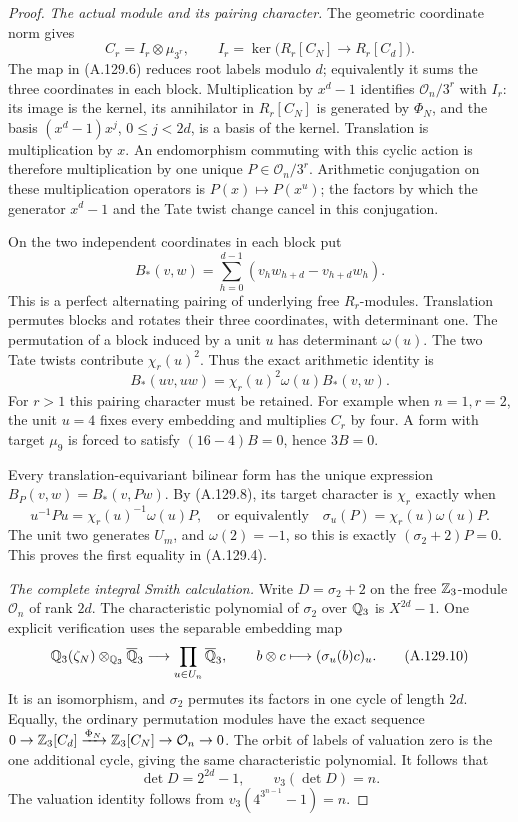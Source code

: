 \begin{proof}
\emph{The actual module and its pairing character.}
The geometric coordinate norm gives
\[
 C_r=I_r\otimes\mu_{3^r},\qquad
 I_r=\ker\bigl(R_r[C_N]\longrightarrow R_r[C_d]\bigr).
 \tag{A.129.6}
\]
The map in (A.129.6) reduces root labels modulo \(d\);
equivalently it sums the three coordinates in each block.
Multiplication by \(x^d-1\) identifies
\(\mathcal O_n/3^r\) with \(I_r\): its image is the kernel,
its annihilator in \(R_r[C_N]\) is generated by \(\Phi_N\),
and the basis \((x^d-1)x^j\), \(0\le j<2d\), is a basis
of the kernel.  Translation is multiplication by \(x\).
An endomorphism commuting with this cyclic action is therefore
multiplication by one unique \(P\in\mathcal O_n/3^r\).
Arithmetic conjugation on these multiplication operators is
\(P(x)\mapsto P(x^u)\); the factors by which the generator
\(x^d-1\) and the Tate twist change cancel in this conjugation.

On the two independent coordinates in each block put
\[
       B_*(v,w)=\sum_{h=0}^{d-1}
                         (v_hw_{h+d}-v_{h+d}w_h).
 \tag{A.129.7}
\]
This is a perfect alternating pairing of underlying free
\(R_r\)-modules.  Translation permutes blocks and rotates
their three coordinates, with determinant one.
The permutation of a block induced by a unit \(u\) has
determinant \(\omega(u)\).  The two Tate twists contribute
\(\chi_r(u)^2\).  Thus the exact arithmetic identity is
\[
                B_*(uv,uw)=\chi_r(u)^2\omega(u)B_*(v,w).
 \tag{A.129.8}
\]
For \(r>1\) this pairing character must be retained.
For example when \(n=1,r=2\), the unit \(u=4\) fixes
every embedding and multiplies \(C_r\) by four.
A form with target \(\mu_9\) is forced to satisfy
\((16-4)B=0\), hence \(3B=0\).

Every translation-equivariant bilinear form has the unique
expression \(B_P(v,w)=B_*(v,Pw)\).
By (A.129.8), its target character is \(\chi_r\) exactly when
\[
 u^{-1}Pu=\chi_r(u)^{-1}\omega(u)P,
       \quad\text{or equivalently}\quad
        \sigma_u(P)=\chi_r(u)\omega(u)P.
 \tag{A.129.9}
\]
The unit two generates \(U_m\), and \(\omega(2)=-1\),
so this is exactly \((\sigma_2+2)P=0\).
This proves the first equality in (A.129.4).

\emph{The complete integral Smith calculation.}
Write \(D=\sigma_2+2\) on the free \(\mathbb Z_3\)-module
\(\mathcal O_n\) of rank \(2d\).
The characteristic polynomial of \(\sigma_2\) over
\(\mathbb Q_3\) is \(X^{2d}-1\).
One explicit verification uses the separable embedding map
\[
 \mathbb Q_3(\zeta_N)\otimes_{\mathbb Q_3}\overline{\mathbb Q}_3
       \longrightarrow
        \prod_{u\in U_n}\overline{\mathbb Q}_3,
             \qquad b\otimes c\longmapsto(\sigma_u(b)c)_u.
 \tag{A.129.10}
\]
It is an isomorphism, and \(\sigma_2\) permutes its factors
in one cycle of length \(2d\).
Equally, the ordinary permutation modules have the exact
sequence
\(0\to\mathbb Z_3[C_d]\xrightarrow{\Phi_N}\mathbb Z_3[C_N]
  \to\mathcal O_n\to0\).
The orbit of labels of valuation zero is the one additional
cycle, giving the same characteristic polynomial.
It follows that
\[
            \det D=2^{2d}-1,\qquad
                      v_3(\det D)=n.
 \tag{A.129.11}
\]
The valuation identity follows from
\(v_3(4^{3^{n-1}}-1)=n\).


\end{proof}
